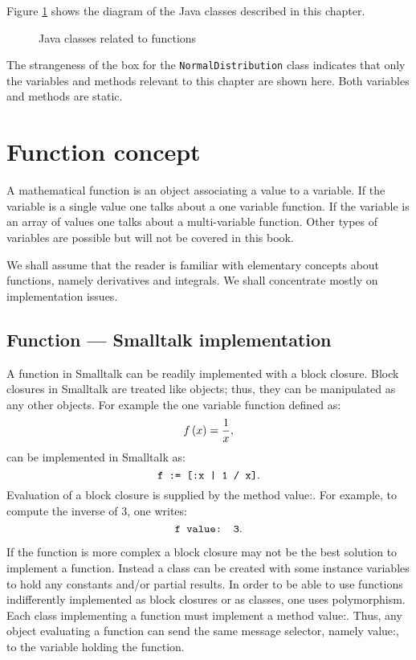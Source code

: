 \documentclass[twoside]{book}
\begin{document}
Figure \ref{fig:functionj} shows the diagram of the Java classes
described in this chapter.
\begin{figure}
\center{}
\caption{Java classes related to functions} \label{fig:functionj}
\end{figure}
The strangeness of the box for the {\tt NormalDistribution} class
indicates that only the variables and methods relevant to this
chapter are shown here. Both variables and methods are static.

\section{Function concept}
\label{sec:function}
A mathematical function is an object
associating a value to a variable. If the variable is a single
value one talks about a one variable function. If the variable is
an array of values one talks about a multi-variable function.
Other types of variables are possible but will not be covered in
this book.

We shall assume that the reader is familiar with elementary
concepts about functions, namely derivatives and integrals. We
shall concentrate mostly on implementation issues.

\subsection{Function --- Smalltalk implementation}
\label{sec:stFunction} A function in Smalltalk
can be readily implemented with a block closure. Block closures in
Smalltalk are treated like objects; thus, they can be manipulated
as any other objects. For example the one variable function
defined as:
\begin{equation}
f\left( x \right)={1 \over x},
\end{equation}
can be implemented in Smalltalk as:
\begin{equation}
\hbox{\tt f := [:x | 1 / x]}.
\end{equation}
Evaluation of a block closure is supplied by the method value:.
For example, to compute the inverse of 3, one writes:
\begin{equation}
\hbox{\tt f value: 3}.
\end{equation}

If the function is more complex a block closure may not be the
best solution to implement a function. Instead a class can be
created with some instance variables to hold any constants and/or
partial results. In order to be able to use functions
indifferently implemented as block closures or as classes, one
uses polymorphism. Each class implementing a function must
implement a method value:. Thus, any object evaluating a function
can send the same message selector, namely value:, to the variable
holding the function.
\end{document}
